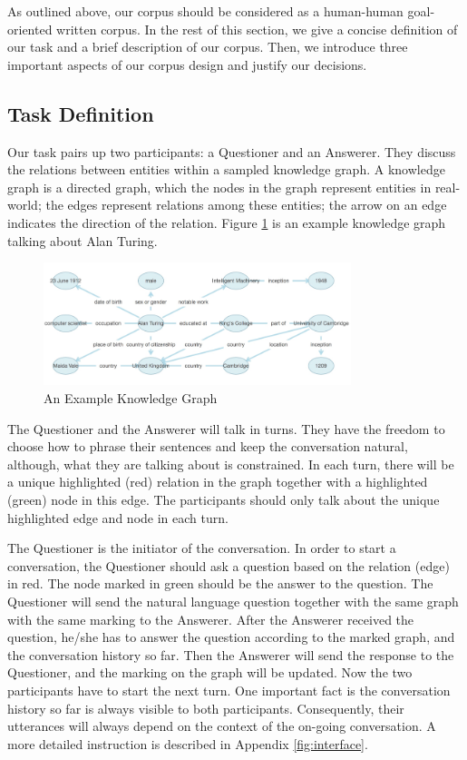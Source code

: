 \documentclass[bsc,frontabs,twoside,singlespacing,parskip,deptreport]{infthesis}     %
\begin{document}
As outlined above, our corpus should be considered as a human-human goal-oriented written corpus. In the rest of this section, we give a concise definition of our task and a brief description of our corpus. Then, we introduce three important aspects of our corpus design and justify our decisions.

\subsection{Task Definition}

Our task pairs up two participants: a Questioner and an Answerer. They discuss the relations between entities within a sampled knowledge graph. A knowledge graph is a directed graph, which the nodes in the graph represent entities in real-world; the edges represent relations among these entities; the arrow on an edge indicates the direction of the relation. Figure \ref{fig:kg} is an example knowledge graph talking about Alan Turing. 

\begin{figure}[h]
    \centering
    \includegraphics[width=0.80\textwidth]{kg.png}
    \caption{An Example Knowledge Graph}
    \label{fig:kg}
\end{figure}


The Questioner and the Answerer will talk in turns. They have the freedom to choose how to phrase their sentences and keep the conversation natural, although, what they are talking about is constrained. In each turn, there will be a unique highlighted (red) relation in the graph together with a highlighted (green) node in this edge. The participants should only talk about the unique highlighted edge and node in each turn.

The Questioner is the initiator of the conversation. In order to start a conversation, the Questioner should ask a question based on the relation (edge) in red. The node marked in green should be the answer to the question. The Questioner will send the natural language question together with the same graph with the same marking to the Answerer. After the Answerer received the question, he/she has to answer the question according to the marked graph, and the conversation history so far. Then the Answerer will send the response to the Questioner, and the marking on the graph will be updated. Now the two participants have to start the next turn. One important fact is the conversation history so far is always visible to both participants. Consequently, their utterances will always depend on the context of the on-going conversation. A more detailed instruction is described in Appendix \ref{fig:interface}.
\end{document}
